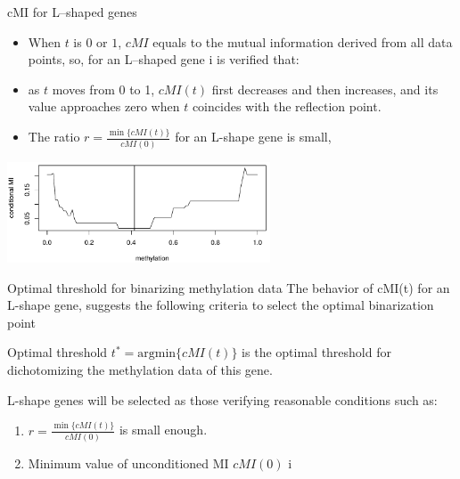 \documentclass[handout]{beamer}
\begin{document}
\begin{frame} {cMI for L--shaped genes}
\begin{itemize}
\item When $t$ is $0$ or $1$, $\mathit{cMI}$ equals to the mutual information derived
from all data points, so, for an L--shaped gene i is verified that:
\item
as $t$ moves from 0 to 1, $\mathit{cMI}(t)$ first decreases and then
increases, and its value approaches zero when $t$ coincides with the reflection point.
\item The ratio $r=\frac{\min\{\mathit{cMI}(t)\}}{\mathit{cMI}(0)}$ for an L-shape gene is small,
\end{itemize}

\begin{center}
\includegraphics[height=3cm]{./images/cMI-methylation.png}
\end{center}
\end{frame}


\begin{frame} {Optimal threshold for binarizing methylation data}
The behavior of cMI(t) for an L-shape gene, suggests the following criteria to select the optimal binarization point
\begin{block}{Optimal threshold}
$t^{\ast} = \mathrm{argmin}\{ \mathit{cMI}(t) \}$ is the optimal threshold for
dichotomizing the methylation data of this gene.
\end{block}
L-shape genes will be selected as those verifying reasonable conditions such as:
\begin{enumerate}
 \item $r=\frac{\min\{\mathit{cMI}(t)\}}{\mathit{cMI}(0)}$ is small enough.
\item Minimum value of unconditioned MI $\mathit{cMI}(0)$ i
\end{enumerate}

\end{frame}

\end{document}
